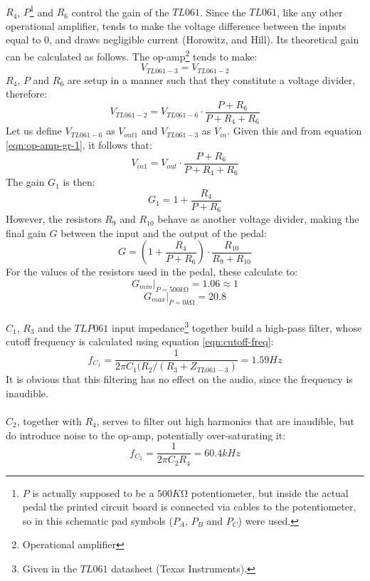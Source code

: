 \documentclass[a4paper, 12pt]{article}
\begin{document}
\paragraph*{}
$R_4$, $P$\footnote{$P$ is actually supposed to be a $500K\si{\ohm}$ 
potentiometer, but inside the actual pedal the printed circuit board is 
connected via cables to the potentiometer, so in this schematic pad symbols 
($P_A$, $P_B$ and $P_C$) were used.} and $R_6$ control the gain of the $TL061$. 
Since the $TL061$, like any other operational amplifier, tends to make the 
voltage difference between the inputs equal to $0$, and draws negligible 
current (Horowitz, and Hill). Its theoretical gain can be calculated as 
follows. The op-amp\footnote{Operational amplifier} tends to make:
\begin{equation}
	V_{TL061-3} = V_{TL061-2}
	\label{eqn:op-amp-gr-1}
\end{equation}
$R_4$, $P$ and $R_6$ are setup in a manner such that they constitute a voltage 
divider, therefore:
$$V_{TL061-2} = V_{TL061-6} \cdot \frac{P + R_6}{P + R_4 + R_6}$$
Let us define $V_{TL061-6}$ as $V_{out1}$ and $V_{TL061-3}$ as $V_{in}$. Given 
this and from equation \ref{eqn:op-amp-gr-1}, it follows that:
$$V_{in1} = V_{out} \cdot \frac{P + R_6}{P + R_4 + R_6}$$
The gain $G_1$ is then:
$$G_1 = 1 + \frac{R_4}{P + R_6}$$
However, the resistors $R_9$ and $R_{10}$ behave as another voltage divider, 
making the final gain $G$ between the input and the output of the pedal:
$$G = (1 + \frac{R_4}{P + R_6}) \cdot \frac{R_{10}}{R_9 + R_{10}}$$
For the values of the resistors used in the pedal, these calculate to:
$$G_{min} |_{P = 500k\si{\ohm}} = 1.06 \approx 1$$
$$G_{max} |_{P = 0k\si{\ohm}} = 20.8$$

\paragraph*{}
$C_1$, $R_3$ and the $TLP061$ input impedance\footnote{Given in the $TL061$ 
datasheet (Texas Instruments).} together build a high-pass filter, whose 
cutoff frequency is calculated using equation \ref{eqn:cutoff-freq}:
$$f_{C_1} = \frac{1}{2 \pi C_1 (R_2 / (R_3 + Z_{TL061-3})} = 1.59 \si{Hz}$$
It is obvious that this filtering has no effect on the audio, since the 
frequency is inaudible.

\paragraph*{}
$C_2$, together with $R_4$, serves to filter out high harmonics that are 
inaudible, but do introduce noise to the op-amp, potentially over-saturating 
it:
$$f_{C_2} = \frac{1}{2 \pi C_2 R_4} = 60.4\si{kHz}$$
\end{document}
